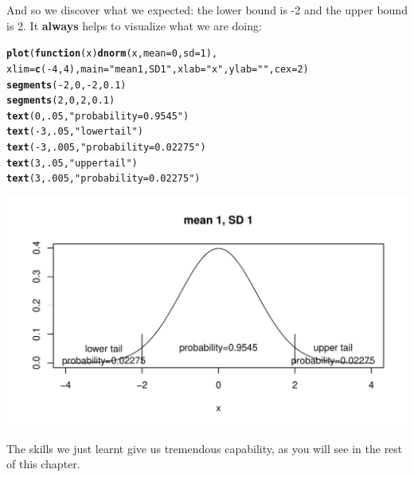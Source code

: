 \documentclass[12pt]{book}\usepackage[]{graphicx}\usepackage[]{color}
\makeatletter
\def\maxwidth{ %
  \ifdim\Gin@nat@width>\linewidth
    \linewidth
  \else
    \Gin@nat@width
  \fi
}
\newcommand{\hlnum}[1]{\textcolor[rgb]{0.686,0.059,0.569}{#1}}%
\newcommand{\hlstr}[1]{\textcolor[rgb]{0.192,0.494,0.8}{#1}}%
\newcommand{\hlopt}[1]{\textcolor[rgb]{0,0,0}{#1}}%
\newcommand{\hlstd}[1]{\textcolor[rgb]{0.345,0.345,0.345}{#1}}%
\newcommand{\hlkwa}[1]{\textcolor[rgb]{0.161,0.373,0.58}{\textbf{#1}}}%
\newcommand{\hlkwc}[1]{\textcolor[rgb]{0.333,0.667,0.333}{#1}}%
\newcommand{\hlkwd}[1]{\textcolor[rgb]{0.737,0.353,0.396}{\textbf{#1}}}%
\newenvironment{kframe}{%
 \def\at@end@of@kframe{}%
 \ifinner\ifhmode%
  \def\at@end@of@kframe{\end{minipage}}%
  \begin{minipage}{\columnwidth}%
 \fi\fi%
 \def\FrameCommand##1{\hskip\@totalleftmargin \hskip-\fboxsep
 \colorbox{shadecolor}{##1}\hskip-\fboxsep
     \hskip-\linewidth \hskip-\@totalleftmargin \hskip\columnwidth}%
 \MakeFramed {\advance\hsize-\width
   \@totalleftmargin\z@ \linewidth\hsize
   \@setminipage}}%
 {\par\unskip\endMakeFramed%
 \at@end@of@kframe}
\newenvironment{knitrout}{}{} %
\makeatother
\begin{document}
And so we discover what we expected: the lower bound is -2 and the upper bound is 2.
It \textbf{always} helps to visualize what we are doing:

\begin{knitrout}
\color{fgcolor}\begin{kframe}
\begin{alltt}
\hlkwd{plot}\hlstd{(}\hlkwa{function}\hlstd{(}\hlkwc{x}\hlstd{)} \hlkwd{dnorm}\hlstd{(x,} \hlkwc{mean} \hlstd{=} \hlnum{0}\hlstd{,} \hlkwc{sd} \hlstd{=} \hlnum{1}\hlstd{),}
\hlkwc{xlim}\hlstd{=}\hlkwd{c}\hlstd{(}\hlopt{-}\hlnum{4}\hlstd{,} \hlnum{4}\hlstd{),}\hlkwc{main}\hlstd{=}\hlstr{"mean 1, SD 1"}\hlstd{,}\hlkwc{xlab}\hlstd{=}\hlstr{"x"}\hlstd{,}\hlkwc{ylab}\hlstd{=}\hlstr{""}\hlstd{,}\hlkwc{cex}\hlstd{=}\hlnum{2}\hlstd{)}
\hlkwd{segments}\hlstd{(}\hlopt{-}\hlnum{2}\hlstd{,} \hlnum{0}\hlstd{,} \hlopt{-}\hlnum{2}\hlstd{,} \hlnum{0.1}\hlstd{)}
\hlkwd{segments}\hlstd{(}\hlnum{2}\hlstd{,} \hlnum{0}\hlstd{,} \hlnum{2}\hlstd{,} \hlnum{0.1}\hlstd{)}
\hlkwd{text}\hlstd{(}\hlnum{0}\hlstd{,}\hlnum{.05}\hlstd{,}\hlstr{"probability=0.9545"}\hlstd{)}
\hlkwd{text}\hlstd{(}\hlopt{-}\hlnum{3}\hlstd{,}\hlnum{.05}\hlstd{,}\hlstr{"lower tail"}\hlstd{)}
\hlkwd{text}\hlstd{(}\hlopt{-}\hlnum{3}\hlstd{,}\hlnum{.005}\hlstd{,}\hlstr{"probability=0.02275"}\hlstd{)}
\hlkwd{text}\hlstd{(}\hlnum{3}\hlstd{,}\hlnum{.05}\hlstd{,}\hlstr{"upper tail"}\hlstd{)}
\hlkwd{text}\hlstd{(}\hlnum{3}\hlstd{,}\hlnum{.005}\hlstd{,}\hlstr{"probability=0.02275"}\hlstd{)}
\end{alltt}
\end{kframe}
\includegraphics[width=\maxwidth]{figure/unnamed-chunk-13-1} 

\end{knitrout}

The skills we just learnt give us tremendous capability, as you will see in the rest of this chapter.
\end{document}
